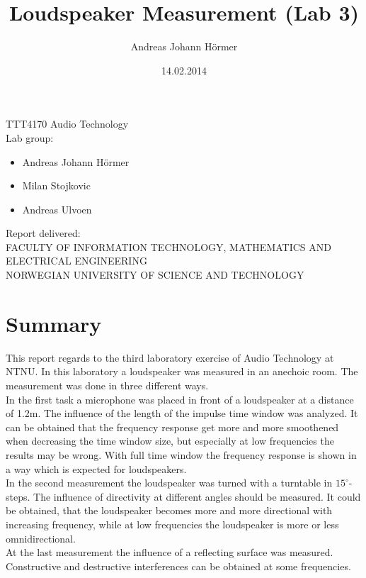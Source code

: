 \documentclass{article}
\title{Loudspeaker Measurement (Lab 3)}
\author{Andreas Johann H\"ormer}
\date{14.02.2014}
\begin{document}
\thispagestyle{empty}
\maketitle
\thispagestyle{empty}
\begin{center}
TTT4170 Audio Technology\\[3cm]
Lab group:
\begin{itemize}
\item Andreas Johann H\"ormer
\item Milan Stojkovic
\item Andreas Ulvoen\\[3cm]
\end{itemize}
Report delivered: \\[6cm]
FACULTY OF INFORMATION TECHNOLOGY, MATHEMATICS AND ELECTRICAL ENGINEERING\\
NORWEGIAN UNIVERSITY OF SCIENCE AND TECHNOLOGY
\end{center}
\thispagestyle{empty}
\tableofcontents
\thispagestyle{empty}
\newpage
\section*{Summary}
\thispagestyle{empty}
This report regards to the third laboratory exercise of Audio Technology at NTNU. In this laboratory a loudspeaker was measured in an anechoic room. The measurement was done in three different ways.\\
In the first task a microphone was placed in front of a loudspeaker at a distance of 1.2m. The influence of the length of the impulse time window was analyzed. It can be obtained that the frequency response get more and more smoothened when decreasing the time window size, but especially at low frequencies the results may be wrong. With full time window the frequency response is shown in a way which is expected for loudspeakers.\\
In the second measurement the loudspeaker was turned with a turntable in $15^\circ$-steps. The influence of directivity at different angles should be measured. It could be obtained, that the loudspeaker becomes more and more directional with increasing frequency, while at low frequencies the loudspeaker is more or less omnidirectional.\\
At the last measurement the influence of a reflecting surface was measured. Constructive and destructive interferences can be obtained at some frequencies.
\newpage
\setcounter{page}{1}
\end{document}
